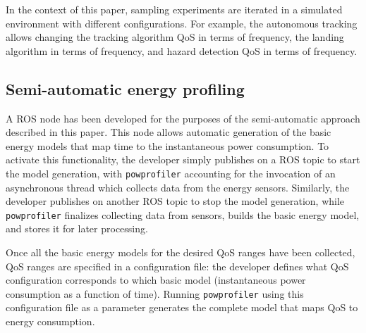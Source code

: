 \documentclass[conference, onecolumn, draftclsnofoot]{IEEEtran}
\newcommand{\stt}[1]{{\small\tt #1}} %
\newcommand{\powprof}{\stt{powprofiler}}
\begin{document}
In the context of this paper, sampling experiments are iterated in a
simulated environment with different configurations.  For example, the
autonomous tracking allows changing the tracking algorithm QoS in
terms of frequency, the landing algorithm in terms of frequency, and
hazard detection QoS in terms of frequency.
%


\subsection{Semi-automatic energy profiling}
\label{sec:semi-automatic}


%
A ROS node has been developed for the purposes of the semi-automatic %
approach described in this paper. This node allows automatic
generation of the basic energy models that map time to the
instantaneous power consumption. To activate this functionality, the developer simply publishes on a ROS
topic to start the model generation, with \powprof{} accounting for
the invocation of an asynchronous thread which collects data from the
energy sensors. Similarly, the developer publishes on another ROS topic to
stop the model generation, while \powprof{} finalizes collecting data from
sensors, builds the basic energy model, and stores it for later processing.


Once all the basic energy models for the desired QoS ranges have been
collected, QoS ranges %
are specified in a configuration file: the developer defines
what QoS configuration corresponds to which basic model
(instantaneous power consumption as a function of time). Running
\powprof{} using this configuration file as a parameter generates the
complete model that maps QoS to energy consumption.
%
\end{document}

